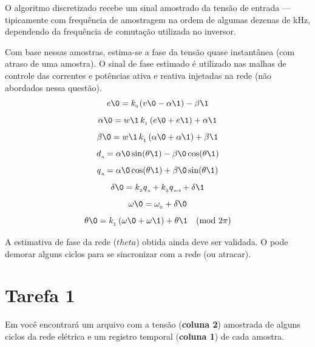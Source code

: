 O algoritmo discretizado recebe um sinal amostrado da tensão de entrada --- tipicamente com frequência de amostragem
na ordem de algumas dezenas de kHz, dependendo da frequência de comutação utilizada no inversor.

Com base nessas amostras, estima-se a fase da tensão quase instantânea (com atraso de uma amostra).
O sinal de fase estimado é utilizado nas malhas de controle das correntes e potências ativa e reativa injetadas na rede
(não abordados nessa questão).
\begin{equation}\label{eq:0}
        e\0 = k_{_0\!} \left( v\0 - \alpha\1 \right)  - \beta\1
\end{equation}
\begin{equation}\label{eq:1}
    \alpha\0 = w\1  \, k_{_1}  \left( e\0 + e\1 \right)  + \alpha\1
\end{equation}
\begin{equation}\label{eq:2}
    \beta\0 = w\1  \, k_{_1}  \left( \alpha\0 + \alpha\1 \right)  + \beta\1
\end{equation}
\begin{equation}\label{eq:3a}
    d{_{_{ n\!}}} =  \alpha\0 \sin(\theta\1) - \beta\0  \cos(\theta\1)
\end{equation}
\begin{equation}\label{eq:3b}
    q{_{_{ n\!}}} =  \alpha\0 \cos(\theta\1) + \beta\0  \sin(\theta\1)
\end{equation}
\begin{equation}\label{eq:4}
    \delta\0 = k_{_2} q{_{_{ n\!}}} + k_{_3} q{_{_{ n\text{-}\!\>\!1\!}}} + \delta\1
\end{equation}
\begin{equation}\label{eq:5}
    \omega\0  = \omega_{_0} + \delta\0
\end{equation}
\begin{equation}\label{eq:6}
    \theta\0 = k_{_1}  \left( \omega\0 + \omega\1 \right)  + \theta\1    \ \ \  (\text{mod}~2\pi)
\end{equation}

A estimativa de fase da rede ($theta$) obtida ainda deve ser validada.
O  pode demorar alguns ciclos para se sincronizar com a rede (ou atracar).


\section*{Tarefa 1}
Em  você encontrará um
arquivo  com a
tensão (\textbf{coluna 2}) amostrada de alguns ciclos da rede elétrica e um registro temporal (\textbf{coluna 1}) de cada amostra.

